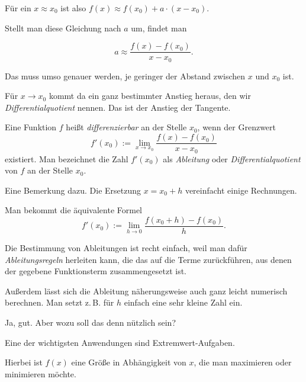 \documentclass[9pt]{beamer}
\begin{document}
\begin{frame}
Für ein $x\approx x_0$ ist also $f(x)\approx f(x_0)+a\cdot (x-x_0)$.
\pause

\vspace{0.8em}
Stellt man diese Gleichung nach $a$ um,\pause{} findet man

\[a \approx \frac{f(x)-f(x_0)}{x-x_0}.\]\pause

Das muss umso genauer werden, je geringer der Abstand zwischen
$x$ und $x_0$ ist.\pause

\vspace{0.8em}
Für $x\to x_0$ kommt da ein ganz bestimmter Anstieg heraus, den
wir \emph{Differentialquotient} nennen. Das ist der
Anstieg der Tangente.
\end{frame}

\begin{frame}
\begin{Definition}
Eine Funktion $f$ heißt \emph{differenzierbar}
an der Stelle $x_0$, wenn der Grenzwert
\[f'(x_0) := \lim_{x\to x_0}\frac{f(x)-f(x_0)}{x-x_0}\]
existiert. Man bezeichnet die Zahl $f'(x_0)$ als \emph{Ableitung} oder
\emph{Differentialquotient} von $f$ an der Stelle $x_0$.
\end{Definition}
\end{frame}

\begin{frame}
Eine Bemerkung dazu. Die Ersetzung $x=x_0+h$ vereinfacht einige
Rechnungen.\pause

\vspace{0.8em}
Man bekommt die äquivalente Formel
\[f'(x_0) := \lim_{h\to 0} \frac{f(x_0+h)-f(x_0)}{h}.\]
\end{frame}

\begin{frame}
Die Bestimmung von Ableitungen ist recht einfach, weil man dafür
\emph{Ableitungsregeln} herleiten kann, die das auf die Terme
zurückführen, aus denen der gegebene Funktionsterm
zusammengesetzt ist.\pause

\vspace{0.8em}
Außerdem lässt sich die Ableitung näherungsweise auch ganz leicht
numerisch berechnen. Man setzt z.\,B. für $h$ einfach eine sehr
kleine Zahl ein.
\end{frame}

\begin{frame}
Ja, gut. Aber wozu soll das denn nützlich sein?
\end{frame}

\begin{frame}
Eine der wichtigsten Anwendungen sind Extremwert-Aufgaben.\pause

\vspace{0.8em}
Hierbei ist $f(x)$ eine Größe in Abhängigkeit von $x$, die
man maximieren oder minimieren möchte.
\end{frame}
\end{document}
